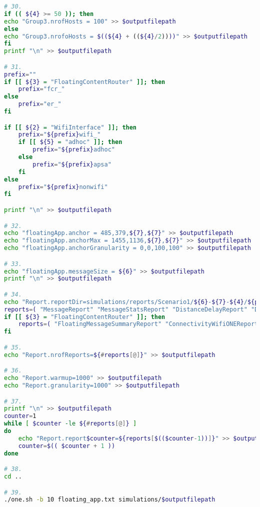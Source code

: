 \begin{lstlisting}[language=bash]
# 30.
if (( ${4} >= 50 )); then
echo "Group3.nrofHosts = 100" >> $outputfilepath
else
echo "Group3.nrofoHosts = $((${4} + ((${4}/2))))" >> $outputfilepath
fi
printf "\n" >> $outputfilepath

# 31.
prefix=""
if [[ ${3} = "FloatingContentRouter" ]]; then
	prefix="fcr_"
else
	prefix="er_"
fi

if [[ ${2} = "WifiInterface" ]]; then
	prefix="${prefix}wifi_"
	if [[ ${5} = "adhoc" ]]; then
		prefix="${prefix}adhoc"
	else
		prefix="${prefix}apsa"
	fi
else
	prefix="${prefix}nonwifi"
fi

printf "\n" >> $outputfilepath

# 32.
echo "floatingApp.anchor = 485,379,${7},${7}" >> $outputfilepath
echo "floatingApp.anchorMax = 1455,1136,${7},${7}" >> $outputfilepath
echo "floatingApp.anchorGranularity = 0,0,100,100" >> $outputfilepath

# 33.
echo "floatingApp.messageSize = ${6}" >> $outputfilepath
printf "\n" >> $outputfilepath

# 34.
echo "Report.reportDir=simulations/reports/Scenario1/${6}-${7}-${4}/${prefix}/"$(date "+%Y-%m-%d %H%M%S") >> $outputfilepath
reports=( "MessageReport" "MessageStatsReport" "DistanceDelayReport" "DeliveredMessagesReport" "MessageDeliveryReport")
if [[ ${3} = "FloatingContentRouter" ]]; then
	reports=( "FloatingMessageSummaryReport" "ConnectivityWifiONEReport")
fi

# 35.
echo "Report.nrofReports=${#reports[@]}" >> $outputfilepath

# 36.
echo "Report.warmup=1000" >> $outputfilepath
echo "Report.granularity=1000" >> $outputfilepath

# 37.
printf "\n" >> $outputfilepath
counter=1
while [ $counter -le ${#reports[@]} ]
do
	echo "Report.report$counter=${reports[$(($counter-1))]}" >> $outputfilepath
	counter=$(( $counter + 1 ))
done

# 38.
cd ..

# 39.
./one.sh -b 10 floating_app.txt simulations/$outputfilepath
\end{lstlisting}
\vspace{5mm}

